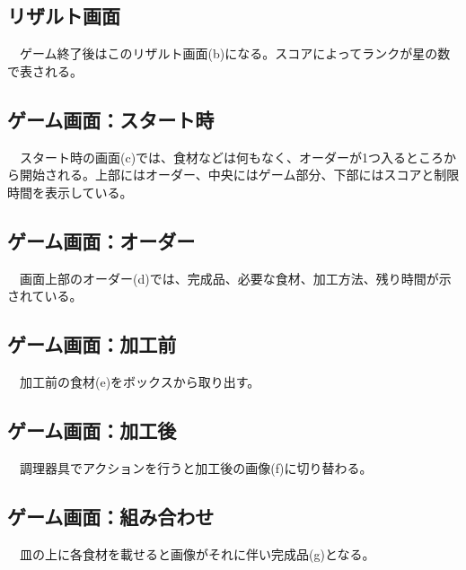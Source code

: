 \documentclass[a4j]{jsarticle} %
\begin{document}
\subsection*{リザルト画面}
　ゲーム終了後はこのリザルト画面(b)になる。スコアによってランクが星の数で表される。
\subsection*{ゲーム画面：スタート時}
　スタート時の画面(c)では、食材などは何もなく、オーダーが1つ入るところから開始される。上部にはオーダー、中央にはゲーム部分、下部にはスコアと制限時間を表示している。
\subsection*{ゲーム画面：オーダー}
　画面上部のオーダー(d)では、完成品、必要な食材、加工方法、残り時間が示されている。
\subsection*{ゲーム画面：加工前}
　加工前の食材(e)をボックスから取り出す。
\subsection*{ゲーム画面：加工後}
　調理器具でアクションを行うと加工後の画像(f)に切り替わる。
\subsection*{ゲーム画面：組み合わせ}
　皿の上に各食材を載せると画像がそれに伴い完成品(g)となる。
\end{document}
